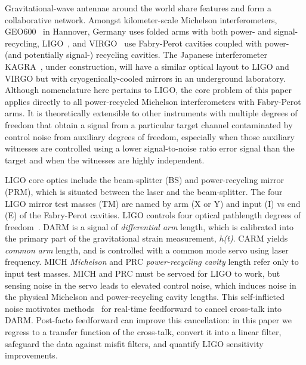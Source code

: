Gravitational-wave antennae around the world share features and form a collaborative network. Amongst kilometer-scale Michelson interferometers, GEO600~\cite{Willke2002} in Hannover, Germany uses folded arms with both power- and signal-recycling, LIGO~\cite{LIGOFirst2004}, and VIRGO~\cite{Acernese2005} use Fabry-Perot cavities coupled with power- (and potentially signal-) recycling cavities. The Japanese interferometer KAGRA~\cite{Kuroda2010}, under construction, will have a similar optical layout to LIGO and VIRGO but with cryogenically-cooled mirrors in an underground laboratory. Although nomenclature here pertains to LIGO, the core problem of this paper applies directly to all power-recycled Michelson interferometers with Fabry-Perot arms. It is theoretically extensible to other instruments with multiple degrees of freedom that obtain a signal from a particular target channel contaminated by control noise from auxiliary degrees of freedom, especially when those auxiliary witnesses are controlled using a lower signal-to-noise ratio error signal than the target and when the witnesses are highly independent.

LIGO core optics include the beam-splitter (BS) and power-recycling mirror (PRM), which is situated between the laser and the beam-splitter. The four LIGO mirror test masses (TM) are named by arm (X or Y) and input (I) vs end (E) of the Fabry-Perot cavities. LIGO controls four optical pathlength degrees of freedom~\cite{LIGOFirst2004,ReadoutGWA}. DARM is a signal of \textit{differential arm} length, which is calibrated into the primary part of the gravitational strain measurement, \textit{h(t)}. CARM yields \textit{common arm} length, and is controlled with a common mode servo using laser frequency. MICH \textit{Michelson} and PRC \textit{power-recycling cavity} length refer only to input test masses. MICH and PRC must be servoed for LIGO to work, but sensing noise in the servo leads to elevated control noise, which induces noise in the physical Michelson and power-recycling cavity lengths. This self-inflicted noise motivates methods~\cite{AllenHuaOttewill1999,AdhikariThesis} for real-time feedforward to cancel cross-talk into DARM. Post-facto feedforward can improve this cancellation: in this paper we regress to a transfer function of the cross-talk, convert it into a linear filter, safeguard the data against misfit filters, and quantify LIGO sensitivity improvements.

